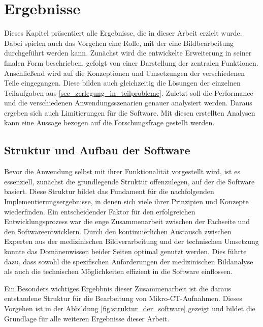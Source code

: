 \chapter{Ergebnisse}
\label{chap:ergebnisse} Dieses Kapitel präsentiert alle Ergebnisse, die in
dieser Arbeit erzielt wurde. Dabei spielen auch das Vorgehen eine Rolle, mit der
eine Bildbearbeitung durchgeführt werden kann. Zunächst wird die entwickelte Erweiterung
in seiner finalen Form beschrieben, gefolgt von einer Darstellung der zentralen
Funktionen. Anschließend wird auf die Konzeptionen und Umsetzungen der verschiedenen
Teile eingegangen. Diese bilden auch gleichzeitig die Lösungen der einzelnen
Teilaufgaben aus \ref{sec_zerlegung_in_teilprobleme}. Zuletzt soll die Performance
und die verschiedenen Anwendungsszenarien genauer analysiert werden. Daraus
ergeben sich auch Limitierungen für die Software. Mit diesen erstellten Analysen
kann eine Aussage bezogen auf die Forschungsfrage gestellt werden.

\section{Struktur und Aufbau der Software}
\label{sec:struktur_der_software} Bevor die Anwendung selbst mit ihrer Funktionalität
vorgestellt wird, ist es essenziell, zunächst die grundlegende Struktur offenzulegen,
auf der die Software basiert. Diese Struktur bildet das Fundament für die nachfolgenden
Implementierungsergebnisse, in denen sich viele ihrer Prinzipien und Konzepte
wiederfinden. Ein entscheidender Faktor für den erfolgreichen Entwicklungsprozess
war die enge Zusammenarbeit zwischen der Fachseite und den Softwareentwicklern.
Durch den kontinuierlichen Austausch zwischen Experten aus der medizinischen
Bildverarbeitung und der technischen Umsetzung konnte das Domänenwissen beider
Seiten optimal genutzt werden. Dies führte dazu, dass sowohl die spezifischen
Anforderungen der medizinischen Bildanalyse als auch die technischen
Möglichkeiten effizient in die Software einflossen.

Ein Besonders wichtiges Ergebbnis dieser Zusammenarbeit ist die daraus
entstandene Struktur für die Bearbeitung von Mikro-CT-Aufnahmen. Dieses Vorgehen
ist in der Abbildung \ref{fig:struktur_der_software} gezeigt und bildet die Grundlage
für alle weiteren Ergebnisse dieser Arbeit.

